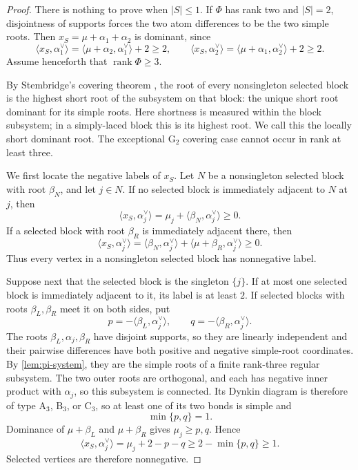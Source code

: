 \documentclass[11pt]{article}
\theoremstyle{definition}
\theoremstyle{remark}
\newcommand{\Raiz}{\Phi}
\newcommand{\typeA}{\ensuremath{\mathrm{A}}}
\newcommand{\typeB}{\ensuremath{\mathrm{B}}}
\newcommand{\typeC}{\ensuremath{\mathrm{C}}}
\newcommand{\typeG}{\ensuremath{\mathrm{G}}}
\begin{document}
\begin{proof}
There is nothing to prove when $|S|\le1$.  If $\Raiz$ has rank two and
$|S|=2$, disjointness of supports forces the two atom differences to be the
two simple roots.  Then $x_S=\mu+\alpha_1+\alpha_2$ is dominant, since
\[
 \langle x_S,\alpha_1^\vee\rangle
   =\langle\mu+\alpha_2,\alpha_1^\vee\rangle+2\ge2,
 \qquad
 \langle x_S,\alpha_2^\vee\rangle
   =\langle\mu+\alpha_1,\alpha_2^\vee\rangle+2\ge2.
\]
Assume henceforth that $\operatorname{rank}\Raiz\ge3$.

By Stembridge's covering theorem \cite[Theorem~2.8]{Stembridge}, the root of
every nonsingleton selected block is the highest short root of the
subsystem on that block: the unique short root dominant for its simple
roots.  Here shortness is measured within the block subsystem; in a
simply-laced block this is its highest root.  We call this the locally short
dominant root.  The exceptional $\typeG_2$ covering case cannot
occur in rank at least three.

We first locate the negative labels of $x_S$.  Let $N$ be a nonsingleton
selected block with root $\beta_N$, and let $j\in N$.  If no selected block is
immediately adjacent to $N$ at $j$, then
\[
 \langle x_S,\alpha_j^\vee\rangle
   =\mu_j+\langle\beta_N,\alpha_j^\vee\rangle\ge0.
\]
If a selected block with root $\beta_R$ is immediately adjacent there, then
\[
 \langle x_S,\alpha_j^\vee\rangle
   =\langle\beta_N,\alpha_j^\vee\rangle
      +\langle\mu+\beta_R,\alpha_j^\vee\rangle\ge0.
\]
Thus every vertex in a nonsingleton selected block has nonnegative label.

Suppose next that the selected block is the singleton $\{j\}$.  If at most
one selected block is immediately adjacent to it, its label is at least $2$.
If selected blocks with roots $\beta_L,\beta_R$ meet it on both sides, put
\[
 p=-\langle\beta_L,\alpha_j^\vee\rangle,
 \qquad
 q=-\langle\beta_R,\alpha_j^\vee\rangle.
\]
The roots $\beta_L,\alpha_j,\beta_R$ have disjoint supports, so they are
linearly independent and their pairwise differences have both positive and
negative simple-root coordinates.  By \cref{lem:pi-system}, they are the
simple roots of a finite rank-three regular subsystem.  The two outer roots
are orthogonal, and each has negative inner product with $\alpha_j$, so this
subsystem is connected.  Its Dynkin diagram
is therefore of type $\typeA_3$, $\typeB_3$, or $\typeC_3$, so at least one of
its two bonds is simple and
\[
             \min\{p,q\}=1.
\]
Dominance of $\mu+\beta_L$ and $\mu+\beta_R$ gives $\mu_j\ge p,q$.  Hence
\[
 \langle x_S,\alpha_j^\vee\rangle
       =\mu_j+2-p-q
       \ge2-\min\{p,q\}\ge1.
\]
Selected vertices are therefore nonnegative.


\end{proof}
\end{document}
